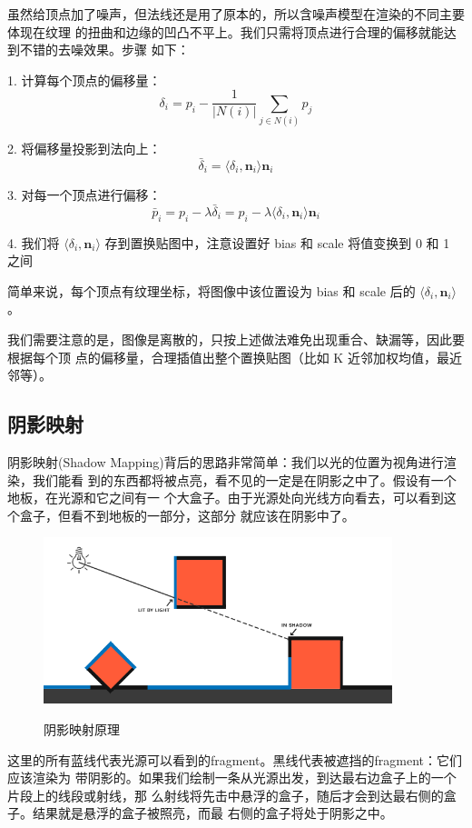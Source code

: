 \documentclass{article}
\begin{document}
	虽然给顶点加了噪声，但法线还是用了原本的，所以含噪声模型在渲染的不同主要体现在纹理
	的扭曲和边缘的凹凸不平上。我们只需将顶点进行合理的偏移就能达到不错的去噪效果。步骤
	如下：

	1. 计算每个顶点的偏移量：
	$$\delta_i=p_i-\frac{1}{|N(i)|}\sum_{j\in N(i)}p_j$$
	
	2. 将偏移量投影到法向上：
	$$\bar{\delta}_i=\langle\delta_i,\pmb{n}_i\rangle \pmb{n}_i$$

	3. 对每一个顶点进行偏移：
	$$\bar{p}_i=p_i-\lambda 
	\bar{\delta}_i=p_i-\lambda\langle\delta_i,\pmb{n}_i\rangle \pmb{n}_i$$
	
	4. 我们将 $\langle\delta_i,\pmb{n}_i\rangle$ 存到置换贴图中，注意设置好 bias 
	和 scale 将值变换到 0 和 1 之间

	简单来说，每个顶点有纹理坐标，将图像中该位置设为 bias 和 scale 后的 
	$\langle\delta_i,\pmb{n}_i\rangle$。
	
	我们需要注意的是，图像是离散的，只按上述做法难免出现重合、缺漏等，因此要根据每个顶
	点的偏移量，合理插值出整个置换贴图（比如 K 近邻加权均值，最近邻等）。
	\subsection{阴影映射}
	阴影映射(Shadow Mapping)背后的思路非常简单：我们以光的位置为视角进行渲染，我们能看
	到的东西都将被点亮，看不见的一定是在阴影之中了。假设有一个地板，在光源和它之间有一
	个大盒子。由于光源处向光线方向看去，可以看到这个盒子，但看不到地板的一部分，这部分
	就应该在阴影中了。
	\begin{figure}[htb]
		\caption{\label{table.label} 阴影映射原理} \centering
		\begin{center}
			\includegraphics[width=4in]{shadow_mapping_theory.png}
			\label{figure.label}
		\end{center}
	\end{figure}
	这里的所有蓝线代表光源可以看到的fragment。黑线代表被遮挡的fragment：它们应该渲染为
	带阴影的。如果我们绘制一条从光源出发，到达最右边盒子上的一个片段上的线段或射线，那
	么射线将先击中悬浮的盒子，随后才会到达最右侧的盒子。结果就是悬浮的盒子被照亮，而最
	右侧的盒子将处于阴影之中。
	
\end{document}
